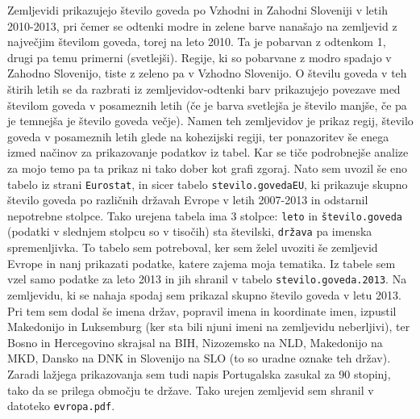 \documentclass[11pt,a4paper]{article}
\begin{document}
\newline
\newline
Zemljevidi prikazujejo število goveda po Vzhodni in Zahodni Sloveniji v letih 2010-2013, pri čemer se odtenki modre in zelene barve nanašajo na zemljevid z največjim številom goveda, torej na leto 2010. Ta je pobarvan z odtenkom 1, drugi pa temu primerni (svetlejši). Regije, ki so pobarvane z modro spadajo v Zahodno Slovenijo, tiste z zeleno pa v Vzhodno Slovenijo. O številu goveda v teh štirih letih se da razbrati iz zemljevidov-odtenki barv prikazujejo povezave med številom goveda v posameznih letih (če je barva svetlejša je število manjše, če pa je temnejša je število goveda večje).
Namen teh zemljevidov je prikaz regij, število goveda v posameznih letih glede na kohezijski regiji, ter ponazoritev še enega izmed načinov za prikazovanje podatkov iz tabel. Kar se tiče podrobnejše analize za mojo temo pa ta prikaz ni tako dober kot grafi zgoraj.
\newline
\newline
\noindent Nato sem uvozil še eno tabelo iz strani \verb|Eurostat|, in sicer tabelo \verb|stevilo.govedaEU|, ki prikazuje skupno število goveda po različnih državah Evrope v letih 2007-2013 in odstarnil nepotrebne stolpce. Tako urejena tabela ima 3 stolpce: \verb|leto| in \verb|število.goveda| (podatki v slednjem stolpcu so v tisočih) sta številski, \verb|država| pa imenska spremenljivka. To tabelo sem potreboval, ker sem želel uvoziti še zemljevid Evrope in nanj prikazati podatke, katere zajema moja tematika. Iz tabele sem vzel samo podatke za leto 2013 in jih shranil v tabelo \verb|stevilo.goveda.2013|.
\newline Na zemljevidu, ki se nahaja spodaj sem prikazal skupno število goveda v letu 2013. Pri tem sem dodal še imena držav, popravil imena in  koordinate imen, izpustil Makedonijo in Luksemburg (ker sta bili njuni imeni na zemljevidu neberljivi), ter Bosno in Hercegovino skrajsal na BIH, Nizozemsko na NLD, Makedonijo na MKD, Dansko na DNK in Slovenijo na SLO (to so uradne oznake teh držav). Zaradi lažjega prikazovanja sem tudi napis Portugalska zasukal za 90 stopinj, tako da se prilega območju te države. Tako urejen zemljevid sem shranil v datoteko \verb|evropa.pdf|.

\end{document}
